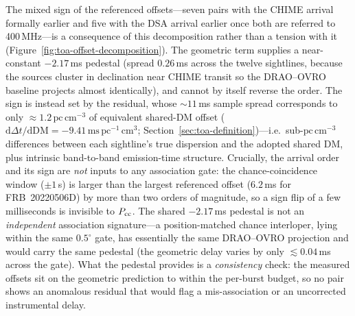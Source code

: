 The mixed sign of the referenced offsets---seven pairs with the CHIME arrival
formally earlier and five with the DSA arrival earlier once both are referred to
400\,MHz---is a consequence of this decomposition rather than a tension with it
(Figure~\ref{fig:toa-offset-decomposition}). The geometric term supplies a
near-constant $-2.17\,$ms pedestal (spread $0.26\,$ms across the twelve
sightlines, because the sources cluster in declination near CHIME transit so the
DRAO--OVRO baseline projects almost identically), and cannot by itself reverse
the order. The sign is instead set by the residual, whose $\sim\!11\,$ms
sample spread corresponds to only $\approx1.2\,\mathrm{pc\,cm^{-3}}$ of
equivalent shared-DM offset ($\mathrm{d}\Delta t/\mathrm{d}\mathrm{DM}=
-9.41\,\mathrm{ms\,pc^{-1}\,cm^{3}}$; Section~\ref{sec:toa-definition})---i.e.\
sub-$\mathrm{pc\,cm^{-3}}$ differences between each sightline's true dispersion
and the adopted shared DM, plus intrinsic band-to-band emission-time structure.
Crucially, the arrival order and its sign are \emph{not} inputs to any
association gate: the chance-coincidence window ($\pm1\,$s) is larger than the
largest referenced offset ($6.2\,$ms for FRB~20220506D) by more than two orders
of magnitude, so a sign flip of a few milliseconds is invisible to
$P_{\rm cc}$. The shared $-2.17\,$ms pedestal is not an \emph{independent}
association signature---a position-matched chance interloper, lying within the
same $0.5^{\circ}$ gate, has essentially the same DRAO--OVRO projection and
would carry the same pedestal (the geometric delay varies by only
$\lesssim0.04\,$ms across the gate). What the pedestal provides is a
\emph{consistency} check: the measured offsets sit on the geometric prediction
to within the per-burst budget, so no pair shows an anomalous residual that
would flag a mis-association or an uncorrected instrumental delay.

